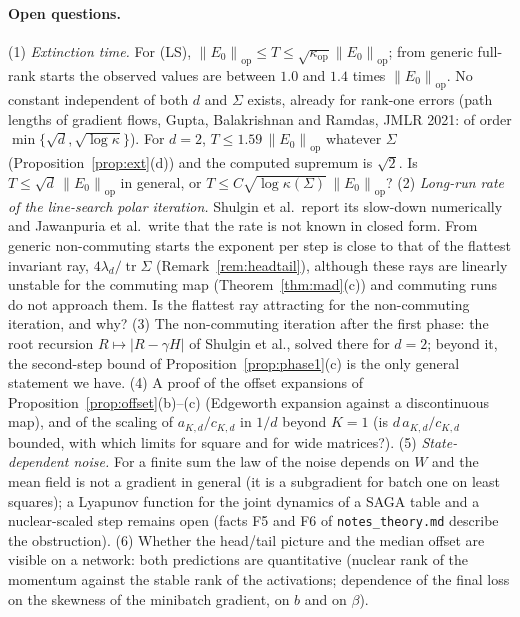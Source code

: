 \documentclass[11pt]{article}
\theoremstyle{definition}
\theoremstyle{remark}
\newcommand{\nop}[1]{\left\|#1\right\|_{\mathrm{op}}}
\newcommand{\abs}[1]{\left|#1\right|}
\newcommand{\tr}{\operatorname{tr}}
\newcommand{\kop}{\kappa_{\mathrm{op}}}
\begin{document}
\paragraph{Open questions.}
(1) \emph{Extinction time.} For (LS), $\nop{E_0}\le T\le\sqrt{\kop}\nop{E_0}$; from generic full-rank starts the observed
values are between $1.0$ and $1.4$ times $\nop{E_0}$. No constant independent of both $d$ and $\Sigma$ exists, already for rank-one errors (path
lengths of gradient flows, Gupta, Balakrishnan and Ramdas, JMLR 2021: of order $\min\{\sqrt d,\sqrt{\log\kappa}\}$).
For $d=2$, $T\le1.59\,\nop{E_0}$ whatever $\Sigma$ (Proposition~\ref{prop:ext}(d)) and the computed supremum is
$\sqrt2$. Is $T\le\sqrt d\,\nop{E_0}$ in general, or $T\le C\sqrt{\log\kappa(\Sigma)}\,\nop{E_0}$?
(2) \emph{Long-run rate of the line-search polar iteration.} Shulgin et al.\ report its slow-down numerically and
Jawanpuria et al.\ write that the rate is not known in closed form. From generic non-commuting starts the exponent per
step is close to that of the flattest invariant ray, $4\lambda_d/\tr\Sigma$ (Remark~\ref{rem:headtail}), although
these rays are linearly unstable for the commuting map (Theorem~\ref{thm:mad}(c)) and commuting runs do not approach
them. Is the flattest ray attracting for the non-commuting iteration, and why?
(3) The non-commuting iteration after the first phase: the root recursion $R\mapsto\abs{R-\gamma H}$ of Shulgin et al.,
solved there for $d=2$; beyond it, the second-step bound of Proposition~\ref{prop:phase1}(c) is the only general
statement we have.
(4) A proof of the offset expansions of Proposition~\ref{prop:offset}(b)--(c) (Edgeworth expansion against a
discontinuous map), and of the scaling of $a_{K,d}/c_{K,d}$ in $1/d$ beyond $K=1$ (is $d\,a_{K,d}/c_{K,d}$ bounded, with
which limits for square and for wide matrices?).
(5) \emph{State-dependent noise.} For a finite sum the law of the noise depends on $W$ and the mean field is not a
gradient in general (it is a subgradient for batch one on least squares); a Lyapunov function for the joint dynamics of
a SAGA table and a nuclear-scaled step remains open (facts F5 and F6 of \texttt{notes\_theory.md} describe the
obstruction).
(6) Whether the head/tail picture and the median offset are visible on a network: both predictions are quantitative
(nuclear rank of the momentum against the stable rank of the activations; dependence of the final loss on the skewness
of the minibatch gradient, on $b$ and on $\beta$).

\appendix
\end{document}
